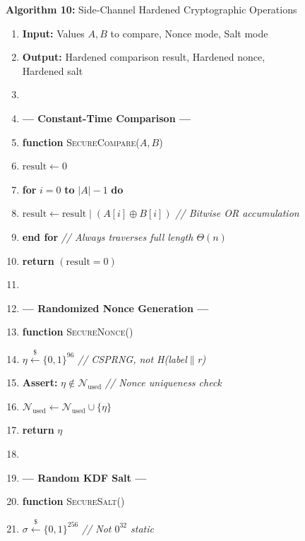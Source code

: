 \documentclass[journal, 10pt, twocolumn]{IEEEtran}
\begin{document}
\begin{figure}[!t]
\hrulefill
\vspace{-0.2cm}
\begin{center}
\textbf{Algorithm 10:} Side-Channel Hardened Cryptographic Operations
\end{center}
\vspace{-0.2cm}
\hrulefill
\begin{enumerate}
    \item \textbf{Input:} Values $A, B$ to compare, Nonce mode, Salt mode
    \item \textbf{Output:} Hardened comparison result, Hardened nonce, Hardened salt
    \item[]
    \item[] \textbf{--- Constant-Time Comparison ---}
    \item \textbf{function} \textsc{SecureCompare}($A, B$)
    \item \quad $\text{result} \leftarrow 0$
    \item \quad \textbf{for} $i = 0$ \textbf{to} $|A| - 1$ \textbf{do}
    \item \quad \quad $\text{result} \leftarrow \text{result} \;|\; (A[i] \oplus B[i])$ \quad \textit{// Bitwise OR accumulation}
    \item \quad \textbf{end for} \quad \textit{// Always traverses full length $\Theta(n)$}
    \item \quad \textbf{return} $(\text{result} = 0)$
    \item[]
    \item[] \textbf{--- Randomized Nonce Generation ---}
    \item \textbf{function} \textsc{SecureNonce}()
    \item \quad $\eta \xleftarrow{\$} \{0,1\}^{96}$ \quad \textit{// CSPRNG, not H(label$\|$r)}
    \item \quad \textbf{Assert:} $\eta \notin \mathcal{N}_{\text{used}}$ \quad \textit{// Nonce uniqueness check}
    \item \quad $\mathcal{N}_{\text{used}} \leftarrow \mathcal{N}_{\text{used}} \cup \{\eta\}$
    \item \quad \textbf{return} $\eta$
    \item[]
    \item[] \textbf{--- Random KDF Salt ---}
    \item \textbf{function} \textsc{SecureSalt}()
    \item \quad $\sigma \xleftarrow{\$} \{0,1\}^{256}$ \quad \textit{// Not $0^{32}$ static}

\end{enumerate}
\end{figure}
\end{document}
